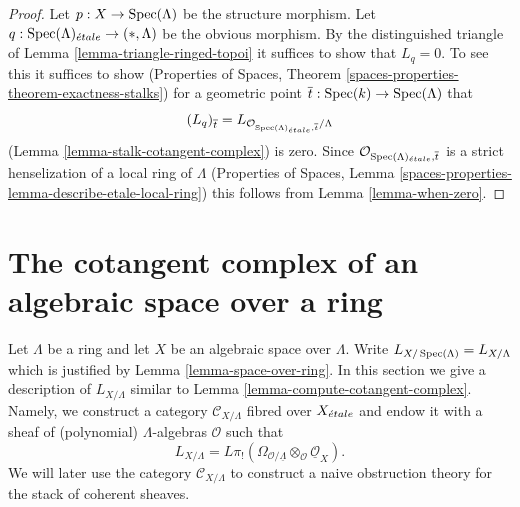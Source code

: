 \begin{proof}
Let $p : X \to \mathop{\mathrm{Spec}}(\Lambda)$ be the structure morphism.
Let $q : \mathop{\mathrm{Spec}}(\Lambda)_{\acute{e}tale} \to (*, \Lambda)$
be the obvious morphism. By the distinguished triangle of
Lemma \ref{lemma-triangle-ringed-topoi}
it suffices to show that $L_q = 0$. To see this it suffices to
show
(Properties of Spaces, Theorem
\ref{spaces-properties-theorem-exactness-stalks})
for a geometric point $\overline{t} : \mathop{\mathrm{Spec}}(k) \to \mathop{\mathrm{Spec}}(\Lambda)$ that
$$
(L_q)_{\overline{t}} =
L_{\mathcal{O}_{\mathop{\mathrm{Spec}}(\Lambda)_{\acute{e}tale}, \overline{t}}/\Lambda}
$$
(Lemma \ref{lemma-stalk-cotangent-complex})
is zero. Since $\mathcal{O}_{\mathop{\mathrm{Spec}}(\Lambda)_{\acute{e}tale}, \overline{t}}$
is a strict henselization of a local ring of $\Lambda$
(Properties of Spaces, Lemma
\ref{spaces-properties-lemma-describe-etale-local-ring})
this follows from Lemma \ref{lemma-when-zero}.
\end{proof}










\section{The cotangent complex of an algebraic space over a ring}
\label{section-cotangent-spaces-variant}

\noindent
Let $\Lambda$ be a ring and let $X$ be an algebraic space over $\Lambda$.
Write $L_{X/\mathop{\mathrm{Spec}}(\Lambda)} = L_{X/\Lambda}$ which is justified
by Lemma \ref{lemma-space-over-ring}.
In this section we give a description of $L_{X/\Lambda}$ similar to
Lemma \ref{lemma-compute-cotangent-complex}.
Namely, we construct a category $\mathcal{C}_{X/\Lambda}$
fibred over $X_{\acute{e}tale}$ and endow it with a sheaf of (polynomial)
$\Lambda$-algebras $\mathcal{O}$ such that
$$
L_{X/\Lambda} =
L\pi_!(\Omega_{\mathcal{O}/\underline{\Lambda}} \otimes_\mathcal{O}
\underline{\mathcal{O}}_X).
$$
We will later use the category $\mathcal{C}_{X/\Lambda}$ to construct
a naive obstruction theory for the stack of coherent sheaves.

